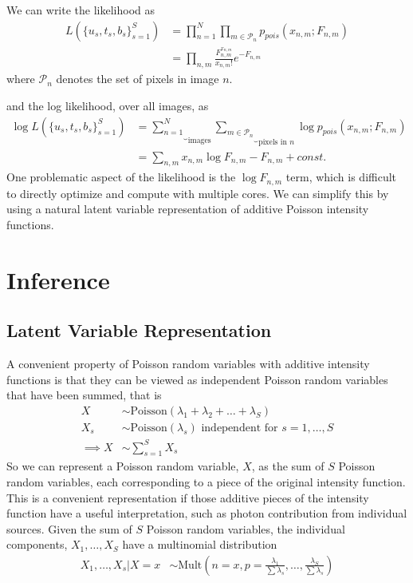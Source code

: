\documentclass[11pt]{article}
\begin{document}
We can write the likelihood as 
\begin{align}
   L(\{u_s, t_s, b_s\}_{s=1}^S)
     &= \prod_{n=1}^N \prod_{m \in \mathcal{P}_n} p_{pois}(x_{n,m} ; F_{n,m}) \\
     &= \prod_{n,m} \frac{ F_{n,m}^{x_{n,m}}}{x_{n,m}!} e^{-F_{n,m}}
\end{align}
where $\mathcal{P}_n$ denotes the set of pixels in image $n$.  

and the log likelihood, over all images, as 
\begin{align}
  \log L(\{u_s, t_s, b_s\}_{s=1}^S) 
    &= \underbrace{\sum_{n=1}^N}_{\text{images}}
       \underbrace{\sum_{m \in \mathcal{P}_n}}_{\text{pixels in $n$}}
       \log p_{pois}(x_{n,m}; F_{n,m}) \\
    &= \sum_{n,m} x_{n,m} \log F_{n,m} - F_{n,m} + const.
\end{align}
One problematic aspect of the likelihood is the $\log F_{n,m}$ term, which is difficult to directly optimize and compute with multiple cores.  We can simplify this by using a natural latent variable representation of additive Poisson intensity functions.  

\section{Inference}

\subsection{Latent Variable Representation}
A convenient property of Poisson random variables with additive intensity functions is that they can be viewed as independent Poisson random variables that have been summed, that is
\begin{align}
  X &\sim \textrm{Poisson}(\lambda_1 + \lambda_2 + \dots + \lambda_S) \\
  X_s &\sim \textrm{Poisson}(\lambda_s) \text{ independent for } s = 1, \dots, S \\
  \implies
  X &\sim \sum_{s=1}^S X_s
\end{align}
So we can represent a Poisson random variable, $X$, as the sum of $S$ Poisson random variables, each corresponding to a piece of the original intensity function.  This is a convenient representation if those additive pieces of the intensity function have a useful interpretation, such as photon contribution from individual sources.  Given the sum of $S$ Poisson random variables, the individual components, $X_1, \dots, X_S$ have a multinomial distribution 
\begin{align}
  X_1, \dots, X_s | X=x &\sim \textrm{Mult}\left(n=x, p= \frac{\lambda_1}{\sum \lambda_s}, \dots, \frac{\lambda_S}{\sum \lambda_s} \right) 
\end{align}
\end{document}
